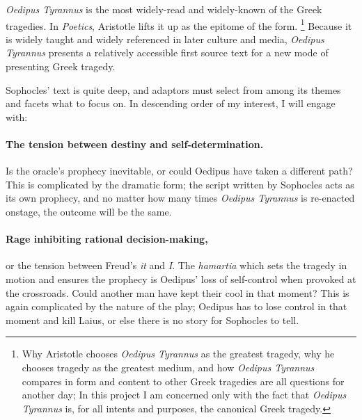 \newcommand{\theplay}{\textit{Oedipus Tyrannus}}%
\newcommand{\thegame}{\textit{Oedipus Text} (working title)}%


\theplay{} is the most widely-read and widely-known of the Greek tragedies. In
\textit{Poetics}, Aristotle lifts it up as the epitome of the form. \footnote{Why
  Aristotle chooses \theplay{} as the greatest tragedy, why he chooses tragedy as the
  greatest medium, and how \theplay{} compares in form and content to other Greek tragedies
  are all questions for another day; In this project I am concerned only with the fact
  that \theplay{} is, for all intents and purposes, the canonical Greek tragedy.} Because it
is widely taught and widely referenced in later culture and media, \theplay{} presents a
relatively accessible first source text for a new mode of presenting Greek tragedy.

Sophocles' text is quite deep, and adaptors must select from among its themes and facets
what to focus on. In descending order of my interest, I will engage with:

\paragraph*{The tension between destiny and self-determination.} Is the oracle's prophecy
inevitable, or could Oedipus have taken a different path? This is complicated by the
dramatic form; the script written by Sophocles acts as its own prophecy, and no matter how
many times \theplay{} is re-enacted onstage, the outcome will be the same.
  
\paragraph*{Rage inhibiting rational decision-making,} or the tension between Freud's
\textit{it} and \textit{I}. The \textit{hamartia} which sets the tragedy in motion and
ensures the prophecy is Oedipus' loss of self-control when provoked at the
crossroads. Could another man have kept their cool in that moment? This is again
complicated by the nature of the play; Oedipus has to lose control in that moment and kill
Laius, or else there is no story for Sophocles to tell.
  
